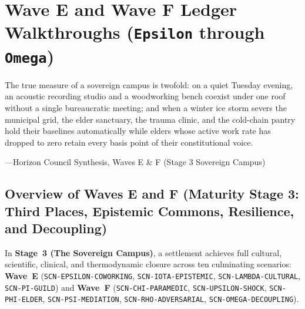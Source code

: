 \chapter{Wave E and Wave F Ledger Walkthroughs (\texttt{Epsilon} through \texttt{Omega})}
\label{ch:waves-e-and-f}

\epigraph{The true measure of a sovereign campus is twofold: on a quiet Tuesday evening, an acoustic recording studio and a woodworking bench coexist under one roof without a single bureaucratic meeting; and when a winter ice storm severs the municipal grid, the elder sanctuary, the trauma clinic, and the cold-chain pantry hold their baselines automatically while elders whose active work rate has dropped to zero retain every basis point of their constitutional voice.}{---Horizon Council Synthesis, Waves E \& F (Stage 3 Sovereign Campus)}

\section{Overview of Waves E and F (Maturity Stage 3: Third Places, Epistemic Commons, Resilience, and Decoupling)}
\label{sec:ch13-overview}

In \textbf{Stage~3 (The Sovereign Campus)}, a settlement achieves full cultural, scientific, clinical, and thermodynamic closure across ten culminating scenarios: \textbf{Wave~E} (\texttt{SCN-EPSILON-COWORKING}, \texttt{SCN-IOTA-EPISTEMIC}, \texttt{SCN-LAMBDA-CULTURAL}, \texttt{SCN-PI-GUILD}) and \textbf{Wave~F} (\texttt{SCN-CHI-PARAMEDIC}, \texttt{SCN-UPSILON-SHOCK}, \texttt{SCN-PHI-ELDER}, \texttt{SCN-PSI-MEDIATION}, \texttt{SCN-RHO-ADVERSARIAL}, \texttt{SCN-OMEGA-DECOUPLING}).


